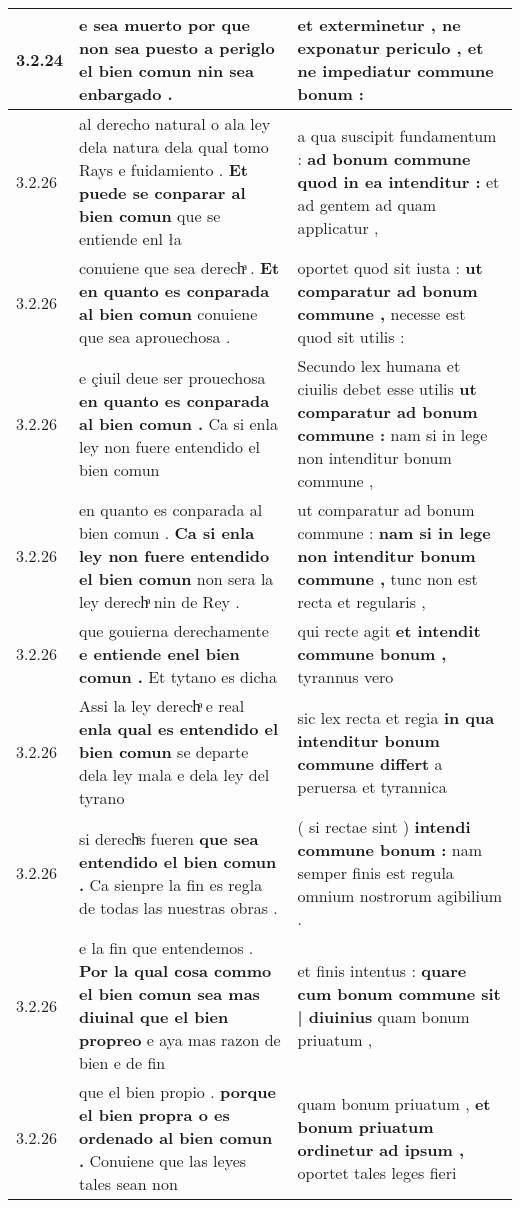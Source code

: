 \begin{tabular}{|p{1cm}|p{6.5cm}|p{6.5cm}|}
3.2.24 & e sea muerto \textbf{ por que non sea puesto a periglo el bien comun } nin sea enbargado . & et exterminetur , \textbf{ ne exponatur periculo , } et ne impediatur commune bonum : \\\hline
3.2.26 & al derecho natural o ala ley dela natura dela qual tomo Rays e fuidamiento . \textbf{ Et puede se conparar al bien comun } que se entiende enl ła & a qua suscipit fundamentum : \textbf{ ad bonum commune quod in ea intenditur : } et ad gentem ad quam applicatur , \\\hline
3.2.26 & conuiene que sea derechͣ . \textbf{ Et en quanto es conparada al bien comun } conuiene que sea aprouechosa . & oportet quod sit iusta : \textbf{ ut comparatur ad bonum commune , } necesse est quod sit utilis : \\\hline
3.2.26 & e çiuil deue ser prouechosa \textbf{ en quanto es conparada al bien comun . } Ca si enla ley non fuere entendido el bien comun & Secundo lex humana et ciuilis debet esse utilis \textbf{ ut comparatur ad bonum commune : } nam si in lege non intenditur bonum commune , \\\hline
3.2.26 & en quanto es conparada al bien comun . \textbf{ Ca si enla ley non fuere entendido el bien comun } non sera la ley derechͣ nin de Rey . & ut comparatur ad bonum commune : \textbf{ nam si in lege non intenditur bonum commune , } tunc non est recta et regularis , \\\hline
3.2.26 & que gouierna derechamente \textbf{ e entiende enel bien comun . } Et tytano es dicha & qui recte agit \textbf{ et intendit commune bonum , } tyrannus vero \\\hline
3.2.26 & Assi la ley derechͣ e real \textbf{ enla qual es entendido el bien comun } se departe dela ley mala e dela ley del tyrano & sic lex recta et regia \textbf{ in qua intenditur bonum commune differt } a peruersa et tyrannica \\\hline
3.2.26 & si derechͣs fueren \textbf{ que sea entendido el bien comun . } Ca sienpre la fin es regla de todas las nuestras obras . & ( si rectae sint ) \textbf{ intendi commune bonum : } nam semper finis est regula omnium nostrorum agibilium . \\\hline
3.2.26 & e la fin que entendemos . \textbf{ Por la qual cosa commo el bien comun sea mas diuinal que el bien propreo } e aya mas razon de bien e de fin & et finis intentus : \textbf{ quare cum bonum commune sit | diuinius } quam bonum priuatum , \\\hline
3.2.26 & que el bien propio . \textbf{ porque el bien propra o es ordenado al bien comun . } Conuiene que las leyes tales sean non & quam bonum priuatum , \textbf{ et bonum priuatum ordinetur ad ipsum , } oportet tales leges fieri \\\hline

\end{tabular}
